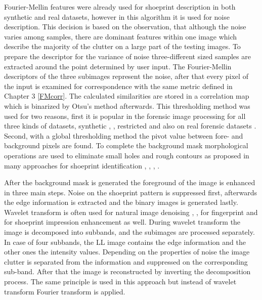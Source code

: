 \documentclass[draft,final]{vutinfth} %
\begin{document}
\par
Fourier-Mellin features were already used for shoeprint description in both synthetic \cite{gueham2008automatic} and real \cite{wu2019crime} datasets, however in this algorithm it is used for noise description.
This decision is based on the observation, that although the noise varies among samples, there are dominant features within one image which describe the majority of the clutter on a large part of the testing images.
To prepare the descriptor for the variance of noise three-different sized samples are extracted around the point determined by user input.
The Fourier-Mellin descriptors of the three subimages represent the noise, after that every pixel of the input is examined for correspondence with the same metric defined in Chapter 3 \ref{FMcorr}.
The calculated similarities are stored in a correlation map which is binarized by Otsu's method afterwards.
This thresholding method was used for two reasons, first it is popular in the forensic image processing for all three kinds of datasets, synthetic \cite{algarni2008novel}, \cite{alizadeh2017automatic}, restricted \cite{kong2014novel} and also on real forensic datasets \cite{wu2019crime}.
Second, with a global thresholding method the pivot value between fore- and background pixels are found.
To complete the background mask morphological operations are used to eliminate small holes and rough contours as proposed in many approaches for shoeprint identification \cite{wang2014automatic}, \cite{kong2014novel}, \cite{li2014retrieval}, \cite{tang2010footwear}.
\par
After the background mask is generated the foreground of the image is enhanced in three main steps.
Noise on the shoeprint pattern is suppressed first, afterwards the edge information is extracted and the binary images is generated lastly.
Wavelet transform is often used for natural image denoising \cite{xu2016image}, \cite{sugamya2016image}, for fingerprint \cite{li2012texture} and for shoeprint impression enhancement \cite{katireddy2017novel} as well.
During wavelet transform the image is decomposed into subbands, and the subimages are processed separately.
In case of four subbands, the LL image contains the edge information and the other ones the intensity values.
Depending on the properties of noise the image clutter is separated from the information and suppressed on the corresponding sub-band.
After that the image is reconstructed by inverting the decomposition process.
The same principle is used in this approach but instead of wavelet transform Fourier transform is applied.
\end{document}
